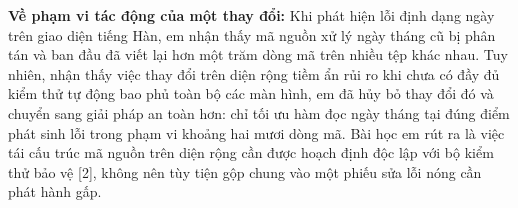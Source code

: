\textbf{Về phạm vi tác động của một thay đổi:} Khi phát hiện lỗi định dạng ngày trên giao diện tiếng Hàn, em nhận thấy mã nguồn xử lý ngày tháng cũ bị phân tán và ban đầu đã viết lại hơn một trăm dòng mã trên nhiều tệp khác nhau. Tuy nhiên, nhận thấy việc thay đổi trên diện rộng tiềm ẩn rủi ro khi chưa có đầy đủ kiểm thử tự động bao phủ toàn bộ các màn hình, em đã hủy bỏ thay đổi đó và chuyển sang giải pháp an toàn hơn: chỉ tối ưu hàm đọc ngày tháng tại đúng điểm phát sinh lỗi trong phạm vi khoảng hai mươi dòng mã. Bài học em rút ra là việc tái cấu trúc mã nguồn trên diện rộng cần được hoạch định độc lập với bộ kiểm thử bảo vệ [2], không nên tùy tiện gộp chung vào một phiếu sửa lỗi nóng cần phát hành gấp.
